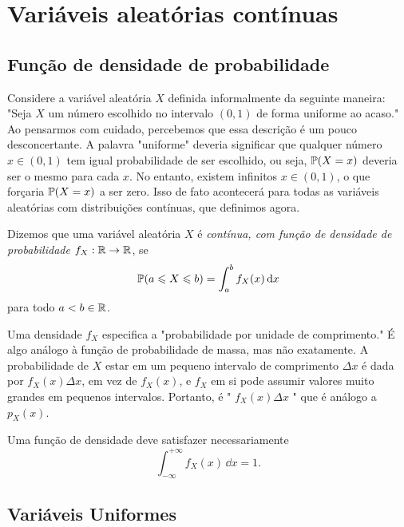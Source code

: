 


\clearpage
\section{Variáveis aleatórias contínuas}

\subsection{Função de densidade de probabilidade}

Considere a variável aleatória $X$ definida informalmente da seguinte maneira: "Seja $X$ um número escolhido no intervalo $(0,1)$ de forma uniforme ao acaso." Ao pensarmos com cuidado, percebemos que essa descrição é um pouco desconcertante. A palavra "uniforme" deveria significar que qualquer número $x \in (0,1)$ tem igual probabilidade de ser escolhido, ou seja, $\mathbb{P}(X = x)$ deveria ser o mesmo para cada $x$. No entanto, existem infinitos $x \in (0,1)$, o que forçaria $\mathbb{P}(X = x)$ a ser zero. Isso de fato acontecerá para todas as variáveis aleatórias com distribuições contínuas, que definimos agora.

\begin{definition}
Dizemos que uma variável aleatória $X$ é \emph{contínua, com função de densidade de probabilidade $f_X: \mathbb{R} \to \mathbb{R}$}, se
\begin{equation}
\mathbb{P}(a \leqslant X \leqslant b) = \int_{a}^{b} f_X(x) \, \mathrm{d} x
\end{equation}
para todo $a < b \in \mathbb{R}$.
\end{definition}

Uma densidade $f_X$ especifica a "probabilidade por unidade de comprimento." É algo análogo à função de probabilidade de massa, mas não exatamente. A probabilidade de $X$ estar em um pequeno intervalo de comprimento $\Delta x$ é dada por $f_X(x) \Delta x$, em vez de $f_X(x)$, e $f_X$ em si pode assumir valores muito grandes em pequenos intervalos. Portanto, é " $f_X(x) \Delta x$ " que é análogo a $p_X(x)$.

Uma função de densidade deve satisfazer necessariamente
\[
\int_{-\infty}^{+\infty} f_X(x) \, \dd x = 1
.
\]

\subsection{Variáveis Uniformes}

